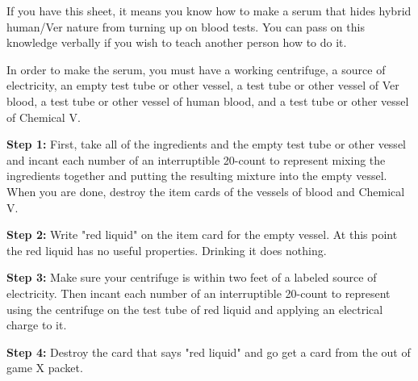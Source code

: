 \documentclass[green]{guildcamp4}
\begin{document}
\name{\gSerum{}}

If you have this sheet, it means you know how to make a serum that hides hybrid human/Ver nature from turning up on blood tests. You can pass on this knowledge verbally if you wish to teach another person how to do it.

In order to make the serum, you must have a working centrifuge, a source of electricity, an empty test tube or other vessel, a test tube or other vessel of Ver blood, a test tube or other vessel of human blood, and a test tube or other vessel of Chemical V.

{\bf Step 1:} First, take all of the ingredients and the empty test tube or other vessel and incant each number of an interruptible 20-count to represent mixing the ingredients together and putting the resulting mixture into the empty vessel. When you are done, destroy the item cards of the vessels of blood and Chemical V.

{\bf Step 2:} Write "red liquid" on the item card for the empty vessel. At this point the red liquid has no useful properties. Drinking it does nothing.

{\bf Step 3:} Make sure your centrifuge is within two feet of a labeled source of electricity. Then incant  each number of an interruptible 20-count to represent using the centrifuge on the test tube of red liquid and applying an electrical charge to it.

{\bf Step 4:} Destroy the card that says "red liquid" and go get a \iSerum{} card from the out of game X packet. 
\end{document}
